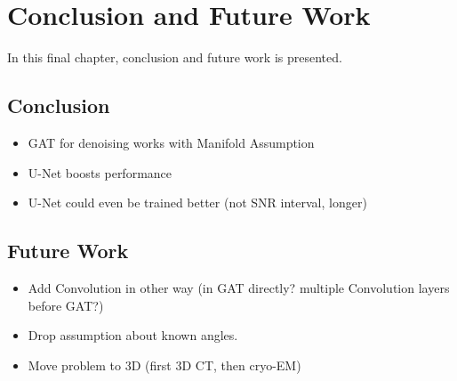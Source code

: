 \chapter{Conclusion and Future Work}
\label{sec:Conclusion}

In this final chapter, conclusion and future work is presented.

\section{Conclusion}




\begin{itemize}
  \item GAT for denoising works with Manifold Assumption
  \item U-Net boosts performance
  \item U-Net could even be trained better (not SNR interval, longer)
\end{itemize}

\section{Future Work}



\begin{itemize}
  \item Add Convolution in other way (in GAT directly? multiple Convolution layers before GAT?)
  \item Drop assumption about known angles.
  \item Move problem to 3D (first 3D CT, then cryo-EM)
\end{itemize}
